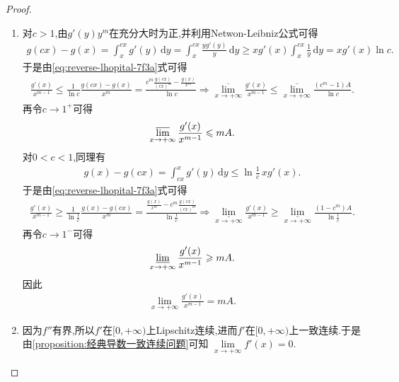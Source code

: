 \documentclass[../../main.tex]{subfiles}%
\begin{document}
\begin{proof}
\begin{enumerate}[(1)]
\item 对$c>1$,由$g'(y)y^m$在充分大时为正,并利用Netwon-Leibniz公式可得
\begin{align*}
g(c x)-g(x)
=\int_x^{cx}g'(y)\,\mathrm{d}y
=\int_x^{cx}\frac{yg'(y)}{y}\,\mathrm{d}y
\geqslant xg'(x)\int_x^{cx}\frac{1}{y}\,\mathrm{d}y
=xg'(x)\ln c.
\end{align*}
于是由\eqref{eq:reverse-lhopital-7f3a}式可得
\begin{align*}
\frac{g’ (x)}{x^{m-1}}\leqslant \frac{1}{\ln c}\frac{g(cx)-g(x)}{x^m}=\frac{c^m\frac{g(cx)}{(cx)^m}-\frac{g(x)}{x^m}}{\ln c}\Longrightarrow \underset{x\rightarrow +\infty}{\overline{\lim }}\frac{g‘ (x)}{x^{m-1}}\leqslant \underset{x\rightarrow +\infty}{\overline{\lim }}\frac{(c^m-1)A}{\ln c}.
\end{align*}
再令$c\to1^+$可得
\begin{align*}
\varlimsup\limits_{x\to+\infty}\frac{g'(x)}{x^{m-1}}
\leqslant mA.
\end{align*}
对$0<c<1$,同理有
\begin{align*}
g(x)-g(cx)
=\int_{cx}^{x}g'(y)\,\mathrm{d}y
\leqslant\ln\frac{1}{c}\,xg'(x).
\end{align*}
于是由\eqref{eq:reverse-lhopital-7f3a}式可得
\begin{align*}
\frac{g' (x)}{x^{m-1}}\geqslant \frac{1}{\ln \frac{1}{c}}\frac{g(x)-g(cx)}{x^m}=\frac{\frac{g(x)}{x^m}-c^m\frac{g(cx)}{(cx)^m}}{\ln \frac{1}{c}}\Longrightarrow \underset{x\rightarrow +\infty}{\underline{\lim }}\frac{g' (x)}{x^{m-1}}\geqslant \underset{x\rightarrow +\infty}{\underline{\lim }}\frac{\left( 1-c^m \right) A}{\ln \frac{1}{c}}.
\end{align*}
再令$c\to1^-$可得
\begin{align*}
\varliminf\limits_{x\to+\infty}\frac{g'(x)}{x^{m-1}}
\geqslant mA.
\end{align*}
因此
\begin{align*}
\lim\limits_{x\to+\infty}\frac{g'(x)}{x^{m-1}}=mA.
\end{align*}

\item 因为$f''$有界,所以$f'$在$[0,+\infty)$上Lipschitz连续,进而$f'$在$[0,+\infty)$上一致连续.于是由\cref{proposition:经典导数一致连续问题}可知
$\lim\limits_{x\to+\infty}f'(x)=0.$
\end{enumerate}
\end{proof}
\end{document}
